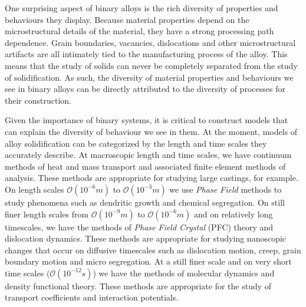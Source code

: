 \label{chapter:introduction}



  

One surprising aspect of binary alloys is the rich diversity of properties and
behaviours they display. Because material properties depend on the
microstructural details of the material, they have a strong processing path dependence.
Grain boundaries, vacancies, dislocations and other microstructural artifacts
are all intimately tied to the manufacturing process of the alloy. This means
that the study of solids can never be completely separated from the study of
solidification. As such, the diversity of material properties and behaviours we
see in binary alloys can be directly attributed to the diversity of processes
for their construction.

Given the importance of binary systems, it is critical to construct models that
can explain the diversity of behaviour we see in them. At the moment, models of
alloy solidification can be categorized by the length and time scales they accurately
describe. At macroscopic length and time scales, we have continuum methods of
heat and mass transport and associated finite element methods of analysis. These
methods are appropriate for studying large castings, for example. On length
scales $\mathcal{O}(10^{-6}m)$ to $\mathcal{O}(10^{-3}m)$ we use
\textit{Phase Field} methods to study phenomena such as dendritic growth and
chemical segregation. On still finer length scales from $\mathcal{O}(10^{-9}m)$
to $\mathcal{O}(10^{-6}m)$ and on relatively long timescales, we have the
methods of \textit{Phase Field Crystal} (PFC) theory and dislocation dynamics.
These methods are appropriate for studying nanoscopic changes that occur on
diffusive timescales such as dislocation motion, creep, grain boundary motion
and micro segregation. At a still finer scale and on very short time scales
($\mathcal{O}(10^{-12}s)$) we have the methods of molecular dynamics and density
functional theory. These methods are appropriate for the study of transport
coefficients and interaction potentials.

